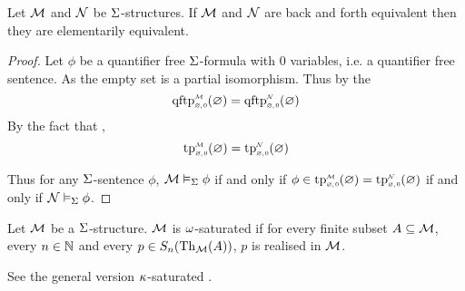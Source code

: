 \begin{cor}
    Let $\mathcal{M}$ and $\mathcal{N}$ be $\Sigma$-structures.
    If $\mathcal{M}$ and $\mathcal{N}$ are back and forth equivalent
    then they are elementarily equivalent.
\end{cor}
\begin{proof}
    Let $\phi$ be a quantifier free $\Sigma$-formula with $0$ variables,
    i.e. a quantifier free sentence.
    As the empty set is a partial isomorphism.
    Thus by the 
    \[\subintp{\nothing,0}{\MM}{\qftp}(\nothing) = 
    \subintp{\nothing,0}{\NN}{\qftp}(\nothing)\]
    By the fact that 
    ,
    \[\subintp{\nothing,0}{\MM}{\tp}(\nothing) = 
    \subintp{\nothing,0}{\NN}{\tp}(\nothing)\]
    
    Thus for any $\Sigma$-sentence $\phi$, $\mathcal{M} \vDash_{\Sigma} \phi$ if and only if 
    $\phi \in \subintp{\nothing,0}{\MM}{\tp}(\nothing) = 
    \subintp{\nothing,0}{\NN}{\tp}(\nothing)$
    if and only if $\mathcal{N} \vDash_{\Sigma} \phi$.
\end{proof}

\begin{dfn}[$\om$-saturation]
    Let $\mathcal{M}$ be a $\Sigma$-structure. 
    $\mathcal{M}$ is $\om$-saturated if for every finite subset $A \subseteq \mathcal{M}$, 
    every $n \in \mathbb{N}$ and every $p \in S_n(\mathrm{Th}_{\mathcal{M}}(A))$,
    $p$ is realised in $\mathcal{M}$.

    See the general version $\kappa$-saturated .
\end{dfn}

